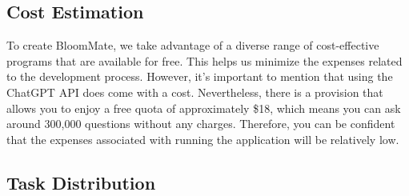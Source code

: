 \documentclass[conference, a4paper]{IEEEtran}
\begin{document}
\subsection{Cost Estimation}
To create BloomMate, we take advantage of a diverse range of cost-effective programs that are available for free. This helps us minimize the expenses related to the development process. However, it's important to mention that using the ChatGPT API does come with a cost. Nevertheless, there is a provision that allows you to enjoy a free quota of approximately \$18, which means you can ask around 300,000 questions without any charges. Therefore, you can be confident that the expenses associated with running the application will be relatively low.\\


\subsection{Task Distribution}
\end{document}
